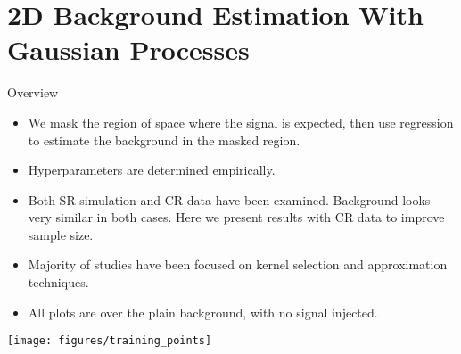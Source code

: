 \documentclass[10pt]{beamer}
\begin{document}

\section[Regression Results]{2D Background Estimation With Gaussian Processes}
\label{sec:2d-gauss-proc}

\begin{frame}{Overview}
  \begin{itemize}
  \item We mask the region of space where the signal is expected, then use regression to estimate the background in the masked region.
  \item Hyperparameters are determined empirically.
  \item Both SR simulation and CR data have been examined. Background looks very similar in both cases. Here we present results with CR data to improve sample size. 
  \item Majority of studies have been focused on kernel selection and approximation techniques.
  \item All plots are over the plain background, with no signal injected.
  \end{itemize}
  \begin{center}
    \texttt{[image: figures/training\_points]}
  \end{center}
\end{frame}
\end{document}
